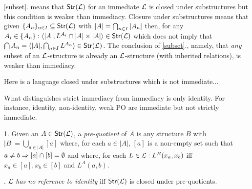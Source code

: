 \documentclass[12pt]{article}
\begin{document}
\ref{subset}. means that ${\sf {Str}}({{\cal{L}}})$ for an immediate ${{\cal{L}}}$ is closed under
substructures but this condition is weaker than immediacy. Closure under
substructures means that given $\{A_{n}\}_{n\in I}\subseteq{\sf {Str}}({{\cal{L}}})$ with
$|A|=\bigcap_{n\in I}|A_n|$ then, for any
$A_i\in\{A_n\}: \langle|A|, L^{A_{i}}\cap |A|\times
|A|\rangle\in{\sf {Str}}({{\cal{L}}})$ which does not imply that $\bigcap A_n=\langle|A|,
\bigcap_{n\in I} L^{A_{n}}\rangle\in{\sf {Str}}({{\cal{L}}})$. The conclusion of \ref{subset}.,
namely, that {\em any}
subset of an ${{\cal{L}}}$-structure is already an ${{\cal{L}}}$-structure (with
inherited relations), is weaker than immediacy.
\begin{Example}
Here is a language closed under substructures which is not immediate...
\end{Example}
What distinguishes strict immediacy from immediacy is only identity.
For instance, identity, non-identity, weak PO are immediate but not strictly immediate. 
\begin{Definition}\label{def:exp}
1. Given an $A\in{\sf {Str}}({{\cal{L}}})$, a {\em pre-quotient} of $A$ is any structure $B$ with
$|B|=\bigcup_{a\in|A|} [a]$ where, for each $a\in|A|$, $[a]$ is a non-empty
set such that $a\not=b \Rightarrow [a]\cap [b]=\emptyset$ and where, for each
$L\in{{\cal{L}}}: L^B(x_a,x_b)$
iff $x_a\in [a],x_b\in [b]$ and $L^A(a,b)$.

. ${{\cal{L}}}$ {\em has no reference to identity} iff ${\sf {Str}}({{\cal{L}}})$ is closed under pre-quotients.
\end{Definition}
%
\end{document}
